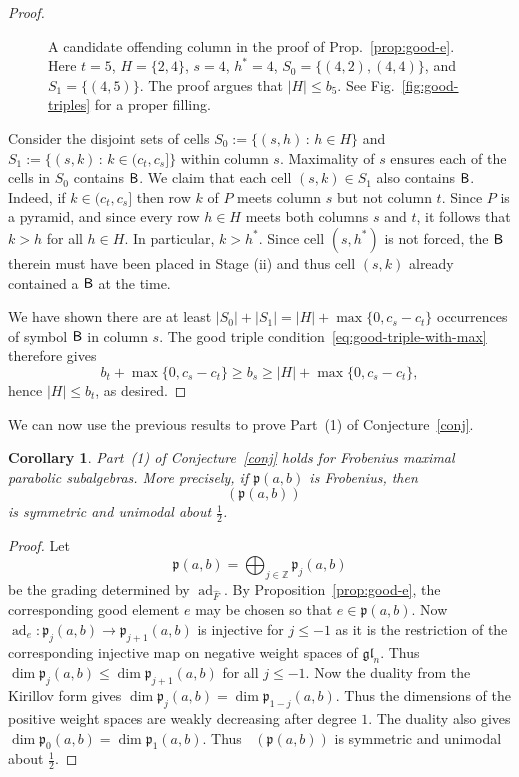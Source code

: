 \documentclass{amsart}
\def\fp{\mathfrak p} %
\def\gl{\mathfrak{gl}}
\newcommand{\pab}[1][a,b]{\fp(#1)}
\def\gln{\gl_n}
\def\dimvec{\mathop{\underline{\mathrm{dim}}}}
\def\ad{\operatorname{ad}}
\newtheorem{corollary}[theorem]{Corollary}
\theoremstyle{definition}
\begin{document}
\begin{proof}
\begin{figure}[h!bt]
    
    \caption{A candidate offending column in the proof of Prop.~\ref{prop:good-e}. Here $t=5$, $H=\{2,4\}$, $s=4$, $h^*=4$, $S_0 = \{(4,2),(4,4)\}$, and $S_1=\{(4,5)\}$. 
    The proof argues that $|H|\leq b_5$. See Fig.~\ref{fig:good-triples} for a proper filling.}
    \label{fig:building-a-filling}    
\end{figure}

Consider the disjoint sets of cells  $S_0:=\{(s,h)\,:\, h \in H\}$
and $S_1 := \{(s,k) \,:\, k \in (c_t,c_s]\}$ within column $s$.
Maximality of $s$ ensures each of the cells in $S_0$ contains $\mathsf{B}$.  We claim that each cell $(s,k) \in S_1$ also contains $\mathsf{B}$. 
Indeed, if $k \in (c_t,c_s]$ then  row $k$ of $P$ meets column $s$ but not column $t$. Since $P$ is a pyramid, and since every row $h \in H$ meets both columns $s$ and $t$, it follows that $k > h$ for all $h \in H$.  In particular, $k > h^*$.   Since  cell $(s,h^*)$ is not forced, the $\mathsf{B}$ therein must have been placed in Stage (ii) and thus cell $(s,k)$ already contained a $\mathsf{B}$ at the time. 

We have shown there are at least $|S_0|+|S_1|=|H|+\max\{0,c_s-c_t\}$ occurrences of symbol $\mathsf{B}$ in column $s$. The good triple condition~\eqref{eq:good-triple-with-max} therefore gives 
$$
b_t + \max\{0,c_s-c_t\} \geq b_s \geq |H|+\max\{0,c_s-c_t\},
$$
hence $|H| \leq b_t$, as desired.
\end{proof}



We can now use the previous results to prove Part~{\rm (1)} of Conjecture~\ref{conj}.
 
\begin{corollary}
\label{cor:conjecture-part1-maximal}
Part~{\rm (1)} of Conjecture~\ref{conj} holds for Frobenius maximal
parabolic subalgebras. More precisely, if $\pab$ is Frobenius, then
\[
\dimvec(\pab)
\]
is symmetric and unimodal about $\frac12$.
\end{corollary}

\begin{proof}
Let
\[
\pab=\bigoplus_{j\in\mathbb Z}\mathfrak p_j(a,b)
\]
be the grading determined by $\ad_{\widehat F}$.
By Proposition~\ref{prop:good-e}, the corresponding good element $e$
may be chosen so that $e\in\pab$. Now $
\ad_e:
\mathfrak p_j(a,b)\longrightarrow\mathfrak p_{j+1}(a,b)
$
is injective for $j\leq -1$ as it is the restriction of the corresponding injective map on negative weight spaces of $\gln$. Thus
$\dim\mathfrak p_j(a,b)\leq
\dim\mathfrak p_{j+1}(a,b)$ for all $j\leq-1.$ Now the duality from the Kirillov form gives $ \dim\mathfrak p_j(a,b)= \dim\mathfrak p_{1-j}(a,b).$
Thus the dimensions of the positive weight spaces are weakly decreasing after degree $1$. The duality also gives $\dim\mathfrak p_0(a,b)=\dim\mathfrak p_1(a,b).$
Thus $\dimvec(\pab)$ is symmetric and unimodal about
$\frac12$.
\end{proof}
\end{document}
